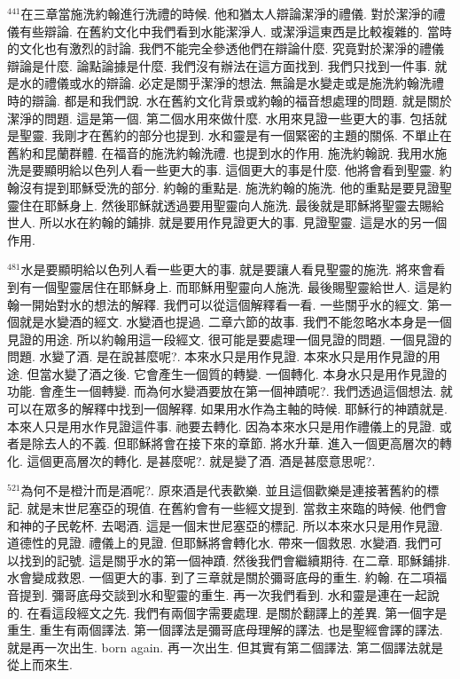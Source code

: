 \documentclass{book}
\begin{document}
$^{441}$在三章當施洗約翰進行洗禮的時候.
他和猶太人辯論潔淨的禮儀.
對於潔淨的禮儀有些辯論.
在舊約文化中我們看到水能潔淨人.
或潔淨這東西是比較複雜的.
當時的文化也有激烈的討論.
我們不能完全參透他們在辯論什麼.
究竟對於潔淨的禮儀辯論是什麼.
論點論據是什麼.
我們沒有辦法在這方面找到.
我們只找到一件事.
就是水的禮儀或水的辯論.
必定是關乎潔淨的想法.
無論是水變走或是施洗約翰洗禮時的辯論.
都是和我們說.
水在舊約文化背景或約翰的福音想處理的問題.
就是關於潔淨的問題.
這是第一個.
第二個水用來做什麼.
水用來見證一些更大的事.
包括就是聖靈.
我剛才在舊約的部分也提到.
水和靈是有一個緊密的主題的關係.
不單止在舊約和昆蘭群體.
在福音的施洗約翰洗禮.
也提到水的作用.
施洗約翰說.
我用水施洗是要顯明給以色列人看一些更大的事.
這個更大的事是什麼.
他將會看到聖靈.
約翰沒有提到耶穌受洗的部分.
約翰的重點是.
施洗約翰的施洗.
他的重點是要見證聖靈住在耶穌身上.
然後耶穌就透過要用聖靈向人施洗.
最後就是耶穌將聖靈去賜給世人.
所以水在約翰的鋪排.
就是要用作見證更大的事.
見證聖靈.
這是水的另一個作用.

$^{481}$水是要顯明給以色列人看一些更大的事.
就是要讓人看見聖靈的施洗.
將來會看到有一個聖靈居住在耶穌身上.
而耶穌用聖靈向人施洗.
最後賜聖靈給世人.
這是約翰一開始對水的想法的解釋.
我們可以從這個解釋看一看.
一些關乎水的經文.
第一個就是水變酒的經文.
水變酒也提過.
二章六節的故事.
我們不能忽略水本身是一個見證的用途.
所以約翰用這一段經文.
很可能是要處理一個見證的問題.
一個見證的問題.
水變了酒.
是在說甚麼呢?.
本來水只是用作見證.
本來水只是用作見證的用途.
但當水變了酒之後.
它會產生一個質的轉變.
一個轉化.
本身水只是用作見證的功能.
會產生一個轉變.
而為何水變酒要放在第一個神蹟呢?.
我們透過這個想法.
就可以在眾多的解釋中找到一個解釋.
如果用水作為主軸的時候.
耶穌行的神蹟就是.
本來人只是用水作見證這件事.
祂要去轉化.
因為本來水只是用作禮儀上的見證.
或者是除去人的不義.
但耶穌將會在接下來的章節.
將水升華.
進入一個更高層次的轉化.
這個更高層次的轉化.
是甚麼呢?.
就是變了酒.
酒是甚麼意思呢?.

$^{521}$為何不是橙汁而是酒呢?.
原來酒是代表歡樂.
並且這個歡樂是連接著舊約的標記.
就是末世尼塞亞的現值.
在舊約會有一些經文提到.
當救主來臨的時候.
他們會和神的子民乾杯.
去喝酒.
這是一個末世尼塞亞的標記.
所以本來水只是用作見證.
道德性的見證.
禮儀上的見證.
但耶穌將會轉化水.
帶來一個救恩.
水變酒.
我們可以找到的記號.
這是關乎水的第一個神蹟.
然後我們會繼續期待.
在二章.
耶穌鋪排.
水會變成救恩.
一個更大的事.
到了三章就是關於彌哥底母的重生.
約翰.
在二項福音提到.
彌哥底母交談到水和聖靈的重生.
再一次我們看到.
水和靈是連在一起說的.
在看這段經文之先.
我們有兩個字需要處理.
是關於翻譯上的差異.
第一個字是重生.
重生有兩個譯法.
第一個譯法是彌哥底母理解的譯法.
也是聖經會譯的譯法.
就是再一次出生.
born again.
再一次出生.
但其實有第二個譯法.
第二個譯法就是從上而來生.
\end{document}
